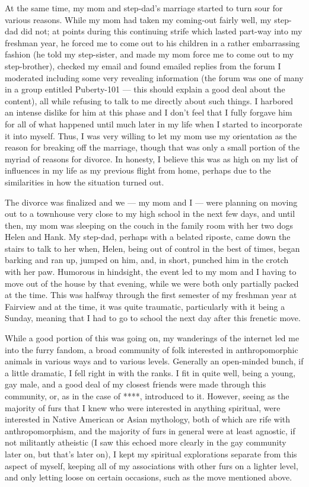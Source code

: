 At the same time, my mom and step-dad's marriage started to turn sour for various reasons. While my mom had taken my coming-out fairly well, my step-dad did not; at points during this continuing strife which lasted part-way into my freshman year, he forced me to come out to his children in a rather embarrassing fashion (he told my step-sister, and made my mom force me to come out to my step-brother), checked my email and found emailed replies from the forum I moderated including some very revealing information (the forum was one of many in a group entitled Puberty-101 --- this should explain a good deal about the content), all while refusing to talk to me directly about such things. I harbored an intense dislike for him at this phase and I don't feel that I fully forgave him for all of what happened until much later in my life when I started to incorporate it into myself. Thus, I was very willing to let my mom use my orientation as the reason for breaking off the marriage, though that was only a small portion of the myriad of reasons for divorce. In honesty, I believe this was as high on my list of influences in my life as my previous flight from home, perhaps due to the similarities in how the situation turned out.

The divorce was finalized and we --- my mom and I --- were planning on moving out to a townhouse very close to my high school in the next few days, and until then, my mom was sleeping on the couch in the family room with her two dogs Helen and Hank. My step-dad, perhaps with a belated riposte, came down the stairs to talk to her when, Helen, being out of control in the best of times, began barking and ran up, jumped on him, and, in short, punched him in the crotch with her paw. Humorous in hindsight, the event led to my mom and I having to move out of the house by that evening, while we were both only partially packed at the time. This was halfway through the first semester of my freshman year at Fairview and at the time, it was quite traumatic, particularly with it being a Sunday, meaning that I had to go to school the next day after this frenetic move.

While a good portion of this was going on, my wanderings of the internet led me into the furry fandom, a broad community of folk interested in anthropomorphic animals in various ways and to various levels. Generally an open-minded bunch, if a little dramatic, I fell right in with the ranks. I fit in quite well, being a young, gay male, and a good deal of my closest friends were made through this community, or, as in the case of ****, introduced to it. However, seeing as the majority of furs that I knew who were interested in anything spiritual, were interested in Native American or Asian mythology, both of which are rife with anthropomorphism, and the majority of furs in general were at least agnostic, if not militantly atheistic (I saw this echoed more clearly in the gay community later on, but that's later on), I kept my spiritual explorations separate from this aspect of myself, keeping all of my associations with other furs on a lighter level, and only letting loose on certain occasions, such as the move mentioned above.

